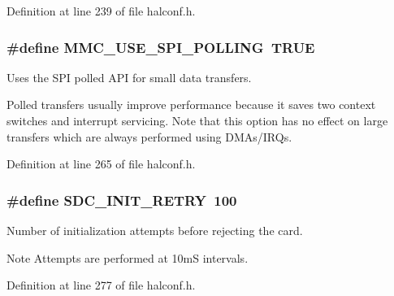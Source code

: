 Definition at line 239 of file halconf.\+h.

\hypertarget{group__HAL__CONF_ga463aaf38dda5f44ab579ddab0a1cf104}{}
\subsubsection[{M\+M\+C\+\_\+\+U\+S\+E\+\_\+\+S\+P\+I\+\_\+\+P\+O\+L\+L\+I\+N\+G}]{\setlength{\rightskip}{0pt plus 5cm}\#define M\+M\+C\+\_\+\+U\+S\+E\+\_\+\+S\+P\+I\+\_\+\+P\+O\+L\+L\+I\+N\+G~T\+R\+U\+E}\label{group__HAL__CONF_ga463aaf38dda5f44ab579ddab0a1cf104}


Uses the S\+P\+I polled A\+P\+I for small data transfers. 

Polled transfers usually improve performance because it saves two context switches and interrupt servicing. Note that this option has no effect on large transfers which are always performed using D\+M\+As/\+I\+R\+Qs. 

Definition at line 265 of file halconf.\+h.

\hypertarget{group__HAL__CONF_ga8d39f0c9799062f0698d97c26e6fa42d}{}
\subsubsection[{S\+D\+C\+\_\+\+I\+N\+I\+T\+\_\+\+R\+E\+T\+R\+Y}]{\setlength{\rightskip}{0pt plus 5cm}\#define S\+D\+C\+\_\+\+I\+N\+I\+T\+\_\+\+R\+E\+T\+R\+Y~100}\label{group__HAL__CONF_ga8d39f0c9799062f0698d97c26e6fa42d}


Number of initialization attempts before rejecting the card. 

\begin{DoxyNote}{Note}
Attempts are performed at 10m\+S intervals. 
\end{DoxyNote}


Definition at line 277 of file halconf.\+h.

